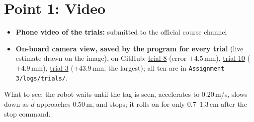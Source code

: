 \documentclass[11pt,a4paper]{article}
\newcommand{\gh}{https://github.com/AmeenUrRehman/RoboMaster-Advanced-Robotics/blob/main/Assignment\%203}
\newcommand{\phonevideo}{submitted to the official course channel}
\begin{document}
\section{Point 1: Video}
\begin{itemize}
  \item \textbf{Phone video of the trials:} \phonevideo
  \item \textbf{On-board camera view, saved by the program for every trial} (live estimate drawn on the image), on GitHub:
  \href{\gh/logs/trials/trial_08.mp4}{trial 8} (error $+4.5$\,mm),
  \href{\gh/logs/trials/trial_10.mp4}{trial 10} ($+4.9$\,mm),
  \href{\gh/logs/trials/trial_03.mp4}{trial 3} ($+43.9$\,mm, the largest); all ten are in \texttt{Assignment 3/logs/trials/}.
\end{itemize}
What to see: the robot waits until the tag is seen, accelerates to 0.20\,m/s, slows down as $\hat d$ approaches 0.50\,m, and stops; it rolls on for only 0.7--1.3\,cm after the stop command.

\end{document}
